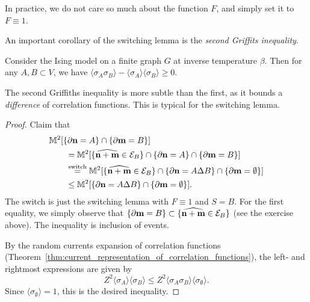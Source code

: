 In practice, we do not care so much about the function $F$, and simply set it to $F\equiv 1$.

An important corollary of the switching lemma is the \emph{second Griffits inequality}.

\begin{lemma}
    Consider the Ising model on a finite graph $G$ at inverse temperature $\beta$.
    Then for any $A,B\subset V$, we have
    $\langle\sigma_{A}\sigma_B\rangle-\langle\sigma_A\rangle\langle\sigma_B\rangle\geq 0$.
\end{lemma}

The second Griffiths inequality is more subtle than the first,
as it bounds a \emph{difference} of correlation functions.
This is typical for the switching lemma.

\begin{proof}
    Claim that
    \begin{align}
        &\M^2[\{\partial\n=A\}\cap\{\partial\m=B\}]
        \\
        &\qquad=
        \M^2[\{\widehat{\n+\m} \in \calE_B\}\cap\{\partial\n=A\}\cap\{\partial\m=B\}]
        \\
        &\qquad\stackrel{\text{switch}}=
        \M^2[\{\widehat{\n+\m} \in \calE_B\}\cap\{\partial\n=A\Delta B\}\cap\{\partial\m=\emptyset\}]
        \\
        &\qquad\leq
        \M^2[\{\partial\n=A\Delta B\}\cap\{\partial\m=\emptyset\}].
    \end{align}
    The switch is just the switching lemma with $F\equiv 1$ and $S=B$.
    For the first equality, we simply observe that $\{\partial\mathbf{m}=B\}\subset \{\widehat{\mathbf{n}+\mathbf{m}} \in \mathcal E_B\}$
    (see the exercise above).
    The inequality is inclusion of events.

    By the random currents expansion of correlation functions (Theorem~\ref{thm:current_representation_of_correlation_functions}),
    the left- and rightmost expressions are given by
    \[
        Z^2\langle\sigma_A\rangle\langle\sigma_B\rangle
        \leq
        Z^2\langle\sigma_A\sigma_B\rangle\langle\sigma_\emptyset\rangle.
    \]
    Since $\langle\sigma_\emptyset\rangle=1$, this is the desired inequality.
\end{proof}

